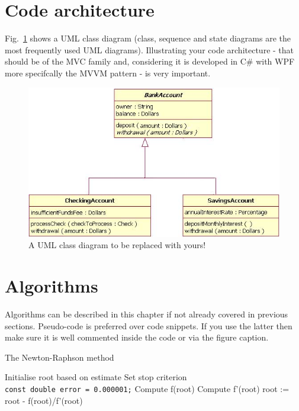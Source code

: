 \documentclass[a4paper, oneside, 11pt]{report}
\begin{document}
\section{Code architecture}

Fig.\ \ref{class} shows a UML class diagram (class, sequence and state diagrams are the most frequently used UML diagrams). Illustrating your code architecture - that should be of the MVC family and, considering it is developed in C\# with WPF more specifcally the MVVM pattern - is very important.

\begin{figure}[htb]
\includegraphics[width=1.0 \columnwidth]{class.png}
\caption{A UML class diagram to be replaced with yours!}
\label{class}
\end{figure}

\section{Algorithms}

Algorithms can be described in this chapter if not already covered in previous sections. Pseudo-code is preferred over code snippets. If you use the latter then make sure it is well commented inside the code or via the figure caption. 

\begin{algorithm}[th]
\caption{ The Newton-Raphson method }
\begin{algorithmic}[1]
\STATE Initialise root based on estimate
\STATE Set stop criterion
\\ \texttt{const double error = 0.000001;}
	\STATE Compute f(root)
	\STATE Compute f'(root)
	\STATE root := root - f(root)/f'(root)
\ENDWHILE
\end{algorithmic}
\end{algorithm}
\end{document}
